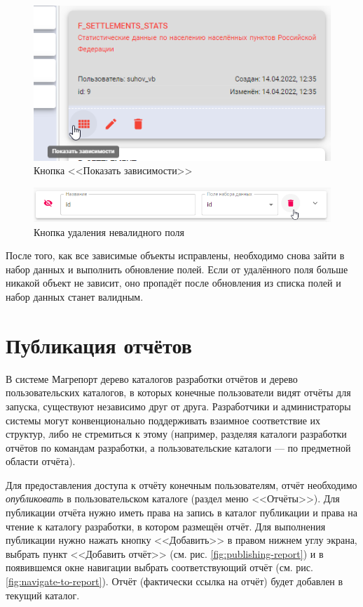 \documentclass[../user-manual.tex]{subfiles}
\begin{document}
	\begin{figure}[h]
		\centering
		\includegraphics[width=\graphicswidth]{img/11-show-dependencies-button.png}
		\caption{Кнопка <<Показать зависимости>>}
		\label{fig:show-dependencies-button}
	\end{figure}	

	\begin{figure}[h]
		\centering
		\includegraphics[width=\graphicswidth]{img/12-delete-field-button.png}
		\caption{Кнопка удаления невалидного поля}
		\label{fig:delete-field-button}
	\end{figure}	
	
	После того, как все зависимые объекты исправлены, необходимо снова зайти в набор данных и выполнить обновление полей. Если от удалённого поля больше никакой объект не зависит, оно пропадёт после обновления из списка полей и набор данных станет валидным.

	\section{Публикация отчётов}\label{developing:publishing-report}
	
	В системе Магрепорт дерево каталогов разработки отчётов и дерево пользовательских каталогов, в которых конечные пользователи видят отчёты для запуска, существуют независимо друг от друга. Разработчики и администраторы системы могут конвенционально поддерживать взаимное соответствие их структур, либо не стремиться к этому (например, разделяя каталоги разработки отчётов по командам разработки, а пользовательские каталоги --- по предметной области отчёта).
	
	Для предоставления доступа к отчёту конечным пользователям, отчёт необходимо \textit{опубликовать} в пользовательском каталоге (раздел меню <<Отчёты>>). Для публикации отчёта нужно иметь права на запись в каталог публикации и права на чтение к каталогу разработки, в котором размещён отчёт. Для выполнения публикации нужно нажать кнопку <<Добавить>> в правом нижнем углу экрана, выбрать пункт <<Добавить отчёт>> (см. рис. \ref{fig:publishing-report}) и в появившемся окне навигации выбрать соответствующий отчёт (см. рис. \ref{fig:navigate-to-report}). Отчёт (фактически ссылка на отчёт) будет добавлен в текущий каталог.
	
\end{document}
